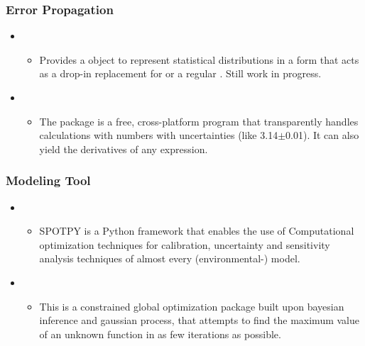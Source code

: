 \documentclass[letterpaper,10pt,english]{sphinxmanual}
\begin{document}
\subsubsection{Error Propagation}
\label{\detokenize{resource/programing/python_statistics:error-propagation}}\begin{itemize}
\item {} 
\begin{itemize}
\item {} 
Provides a  object to represent statistical
distributions in a form that acts as a drop-in replacement for
 or a regular . Still work in
progress.

\end{itemize}

\item {} 
\begin{itemize}
\item {} 
The  package is a free, cross-platform program
that transparently handles calculations with numbers with
uncertainties (like 3.14\(\pm\)0.01). It can also yield the derivatives
of any expression.

\end{itemize}

\end{itemize}


\subsubsection{Modeling Tool}
\label{\detokenize{resource/programing/python_statistics:modeling-tool}}\begin{itemize}
\item {} 
\begin{itemize}
\item {} 
SPOTPY is a Python framework that enables the use of Computational
optimization techniques for calibration, uncertainty and
sensitivity analysis techniques of almost every (environmental-)
model.

\end{itemize}

\item {} 
\begin{itemize}
\item {} 
This is a constrained global optimization package built upon
bayesian inference and gaussian process, that attempts to find the
maximum value of an unknown function in as few iterations as
possible.

\end{itemize}

\end{itemize}
\end{document}
